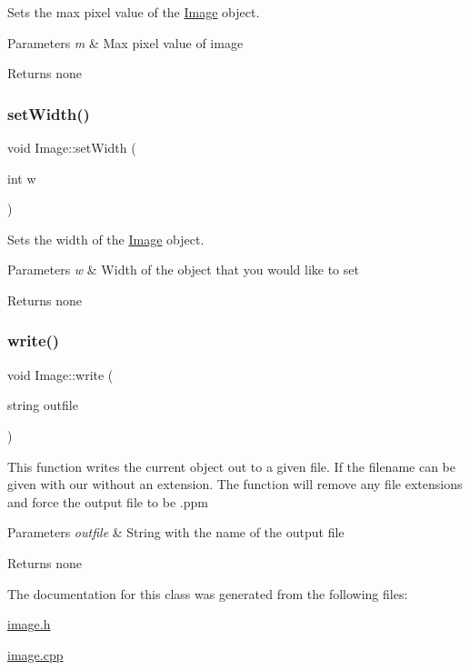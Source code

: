 Sets the max pixel value of the \hyperlink{class_image}{Image} object.


\begin{DoxyParams}{Parameters}
{\em m} & Max pixel value of image \\
\hline
\end{DoxyParams}
\begin{DoxyReturn}{Returns}
none 
\end{DoxyReturn}
\mbox{\label{class_image_a385abd0ecca8787fe15d9a72ac60001a}} 
\subsubsection{\texorpdfstring{set\+Width()}{setWidth()}}
{\footnotesize\ttfamily void Image\+::set\+Width (\begin{DoxyParamCaption}\item[{int}]{w }\end{DoxyParamCaption})}

Sets the width of the \hyperlink{class_image}{Image} object.


\begin{DoxyParams}{Parameters}
{\em w} & Width of the object that you would like to set \\
\hline
\end{DoxyParams}
\begin{DoxyReturn}{Returns}
none 
\end{DoxyReturn}
\mbox{\label{class_image_addd74434babf60a45c1d7b9fc155723a}} 
\subsubsection{\texorpdfstring{write()}{write()}}
{\footnotesize\ttfamily void Image\+::write (\begin{DoxyParamCaption}\item[{string}]{outfile }\end{DoxyParamCaption})}

This function writes the current object out to a given file. If the filename can be given with our without an extension. The function will remove any file extensions and force the output file to be .ppm


\begin{DoxyParams}{Parameters}
{\em outfile} & String with the name of the output file \\
\hline
\end{DoxyParams}
\begin{DoxyReturn}{Returns}
none 
\end{DoxyReturn}


The documentation for this class was generated from the following files\+:\begin{DoxyCompactItemize}
\item 
\hyperlink{image_8h}{image.\+h}\item 
\hyperlink{image_8cpp}{image.\+cpp}\end{DoxyCompactItemize}
